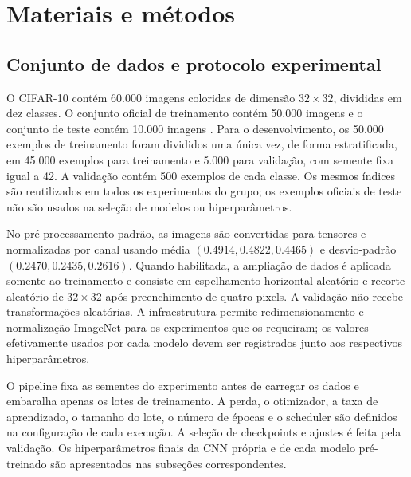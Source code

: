 \documentclass[10pt,a4paper]{article}
\begin{document}
\section{Materiais e métodos}

\subsection{Conjunto de dados e protocolo experimental}

O CIFAR-10 contém 60.000 imagens coloridas de dimensão $32\times32$, divididas
em dez classes. O conjunto oficial de treinamento contém 50.000 imagens e o
conjunto de teste contém 10.000 imagens \cite{krizhevsky2009}. Para o
desenvolvimento, os 50.000 exemplos de treinamento foram divididos uma única
vez, de forma estratificada, em 45.000 exemplos para treinamento e 5.000 para
validação, com semente fixa igual a 42. A validação contém 500 exemplos de cada
classe. Os mesmos índices são reutilizados em todos os experimentos do grupo;
os exemplos oficiais de teste não são usados na seleção de modelos ou
hiperparâmetros.

No pré-processamento padrão, as imagens são convertidas para tensores e
normalizadas por canal usando média $(0.4914, 0.4822, 0.4465)$ e desvio-padrão
$(0.2470, 0.2435, 0.2616)$. Quando habilitada, a ampliação de dados é aplicada
somente ao treinamento e consiste em espelhamento horizontal aleatório e
recorte aleatório de $32\times32$ após preenchimento de quatro pixels. A
validação não recebe transformações aleatórias. A infraestrutura permite
redimensionamento e normalização ImageNet para os experimentos que os
requeiram; os valores efetivamente usados por cada modelo devem ser registrados
junto aos respectivos hiperparâmetros.

O pipeline fixa as sementes do experimento antes de carregar os dados e
embaralha apenas os lotes de treinamento. A perda, o otimizador, a taxa de
aprendizado, o tamanho do lote, o número de épocas e o scheduler são definidos
na configuração de cada execução. A seleção de checkpoints e ajustes é feita
pela validação. Os hiperparâmetros finais da CNN própria e de cada modelo
pré-treinado são apresentados nas subseções correspondentes.
\end{document}
